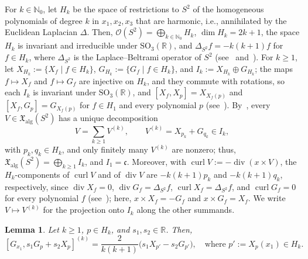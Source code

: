 \documentclass{article}
\newcommand{\N}{\mathbb{N}}
\newcommand{\R}{\mathbb{R}}
\newcommand{\frakc}{\mathfrak{c}}
\newcommand{\xalg}{\mathfrak X_{\mathrm{alg}}}
\newcommand{\Ocal}{\mathcal{O}}
\newtheorem{lemma}{Lemma}
\theoremstyle{definition}
\theoremstyle{plain}
\begin{document}
For $k\in\N_0$, let $H_k$ be the space of restrictions to $S^2$ of the homogeneous polynomials of degree $k$ in $x_1,x_2,x_3$ that are harmonic, i.e., annihilated by the Euclidean Laplacian $\Delta$.
Then, $\Ocal(S^2)=\bigoplus_{k\in\N_0}H_k$, $\dim H_k=2k+1$, the space $H_k$ is invariant and irreducible under $\mathrm{SO}_3(\R)$, and $\Delta_{S^2}f=-k(k+1)f$ for $f\in H_k$,
where $\Delta_{S^2}$ is the Laplace--Beltrami operator of $S^2$ (see~\cite[Section~2.1]{CofDS2} and~\cite[Theorems~1.4.5 and~1.7.2]{DaiXu}).
For $k\geq1$, let $X_{H_k}:=\{X_f\mid f\in H_k\}$, $G_{H_k}:=\{G_f\mid f\in H_k\}$, and $I_k:=X_{H_k}\oplus G_{H_k}$; the maps $f\mapsto X_f$ and $f\mapsto G_f$ are injective on $H_k$, and they commute with rotations, so each $I_k$ is invariant under $\mathrm{SO}_3(\R)$, and $[X_f,X_p]=X_{X_f(p)}$ and $[X_f,G_p]=G_{X_f(p)}$ for $f\in H_1$ and every polynomial $p$ (see~\cite[Section~2.2]{CofDS2}).
By~\cite[Proposition~1]{CofDS2}, every $V\in\xalg(S^2)$ has a unique decomposition
\begin{equation}\label{eq:S2-decomposition}
V=\sum_{k\geq1}V^{(k)}, \qquad
V^{(k)}=X_{p_k}+G_{q_k}\in I_k,
\end{equation}
with $p_k,q_k\in H_k$, and only finitely many $V^{(k)}$ are nonzero; thus, $\xalg(S^2)=\bigoplus_{k\geq1}I_k$, and $I_1=\frakc$.
Moreover, with $\operatorname{curl}V:=-\operatorname{div}(x\times V)$, the $H_k$-components of $\operatorname{curl}V$ and of $\operatorname{div}V$ are $-k(k+1)p_k$ and $-k(k+1)q_k$, respectively, since $\operatorname{div}X_f=0$, $\operatorname{div}G_f=\Delta_{S^2}f$, $\operatorname{curl}X_f=\Delta_{S^2}f$, and $\operatorname{curl}G_f=0$ for every polynomial $f$ (see~\cite[Section~2.2]{CofDS2}); here, $x\times X_f=-G_f$ and $x\times G_f=X_f$.
We write $V\mapsto V^{(k)}$ for the projection onto $I_k$ along the other summands.


\begin{lemma}\label{lem:S2-bracket}
Let $k\geq1$, $p\in H_k$, and $s_1,s_2\in\R$. Then,
$$
[G_{x_1},s_1 G_p+s_2 X_p]^{(k)}=\frac{2}{k(k+1)}\bigl(s_1 X_{p'}-s_2 G_{p'}\bigr),   \quad\mbox{where } p':=X_p(x_1)\in H_k.
$$
\end{lemma}
\end{document}
